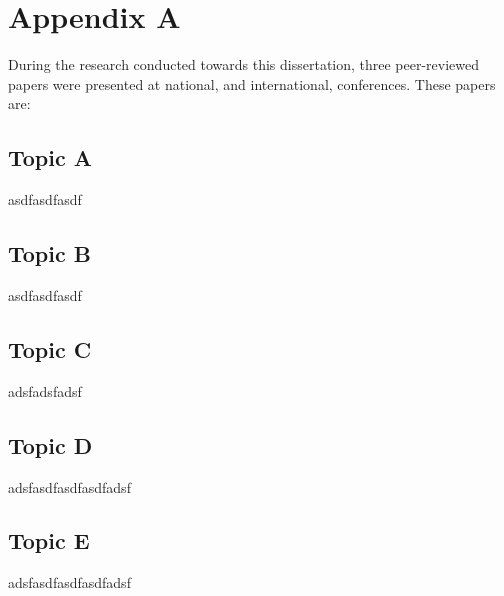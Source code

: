 \chapter{Appendix A}
\label{appendix: Appendix A}

During the research conducted towards this dissertation, three
peer-reviewed papers were presented at national, and
international, conferences. These papers are:

\section{Topic A}
asdfasdfasdf

\section{Topic B}
asdfasdfasdf

\section{Topic C}
adsfadsfadsf

\section{Topic D}
adsfasdfasdfasdfadsf

\section{Topic E}
adsfasdfasdfasdfadsf